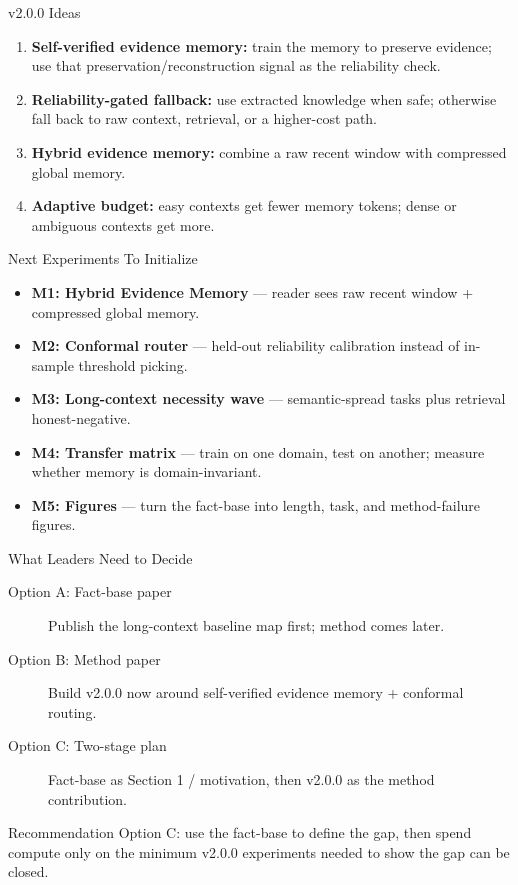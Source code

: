 \begin{frame}{v2.0.0 Ideas}
  \small
  \begin{enumerate}
    \item \textbf{Self-verified evidence memory:} train the memory to preserve evidence;
      use that preservation/reconstruction signal as the reliability check.
    \item \textbf{Reliability-gated fallback:} use extracted knowledge when safe;
      otherwise fall back to raw context, retrieval, or a higher-cost path.
    \item \textbf{Hybrid evidence memory:} combine a raw recent window with compressed global memory.
    \item \textbf{Adaptive budget:} easy contexts get fewer memory tokens; dense or ambiguous contexts get more.
  \end{enumerate}
\end{frame}

\begin{frame}{Next Experiments To Initialize}
  \small
  \begin{itemize}
    \item \textbf{M1: Hybrid Evidence Memory} --- reader sees raw recent window + compressed global memory.
    \item \textbf{M2: Conformal router} --- held-out reliability calibration instead of in-sample threshold picking.
    \item \textbf{M3: Long-context necessity wave} --- semantic-spread tasks plus retrieval honest-negative.
    \item \textbf{M4: Transfer matrix} --- train on one domain, test on another; measure whether memory is domain-invariant.
    \item \textbf{M5: Figures} --- turn the fact-base into length, task, and method-failure figures.
  \end{itemize}
\end{frame}

\begin{frame}{What Leaders Need to Decide}
  \small
  \begin{description}
    \item[Option A: Fact-base paper] Publish the long-context baseline map first; method comes later.
    \item[Option B: Method paper] Build v2.0.0 now around self-verified evidence memory + conformal routing.
    \item[Option C: Two-stage plan] Fact-base as Section 1 / motivation, then v2.0.0 as the method contribution.
  \end{description}
  \begin{block}{Recommendation}
    Option C: use the fact-base to define the gap, then spend compute only on the
    minimum v2.0.0 experiments needed to show the gap can be closed.
  \end{block}
\end{frame}

